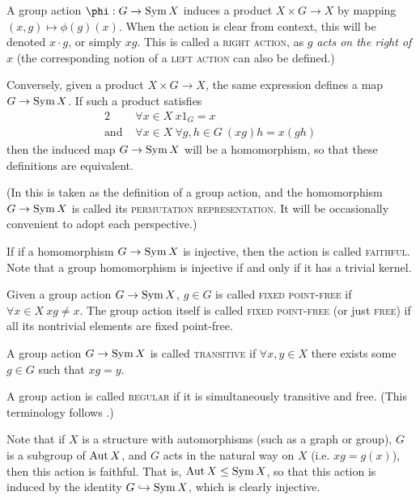 \documentclass{report}
\begin{document}
    A group action $\phi: G \to \Sym X$ induces a product
    $X \times G \to X$ by mapping $(x, g) \mapsto \phi(g)(x)$.
    When the action is clear from context,
    this will be denoted $x \cdot g$, or simply $xg$.
    This is called a \textsc{right action},
    as $g$ \textit{acts on the right of} $x$
    (the corresponding notion of a \textsc{left action}
    can also be defined.)

    Conversely, given a product $X \times G \to X$,
    the same expression defines a map $G \to \operatorname{Sym} X$.
    If such a product satisfies
    \begin{alignat*}{2}
      &\forall x \in X\ x 1_G = x \\
      \text{and } &\forall x \in X\ \forall g, h \in G\
        (x g) h = x(gh)
    \end{alignat*}
    then the induced map $G \to \operatorname{Sym} X$ will be a homomorphism,
    so that these definitions are equivalent.

    (In \cite{dummit-foote}
    this is taken as the definition of a group action,
    and the homomorphism $G \to \operatorname{Sym} X$ is called its \textsc{permutation
    representation}.  It will be occasionally convenient to adopt each
    perspective.)

    \begin{defn}\label{group-action-types}
      If if a homomorphism $G \to \operatorname{Sym} X$ is injective,
      then the action is called \textsc{faithful}.
      Note that a group homomorphism is injective
      if and only if it has a trivial kernel.

      Given a group action $G \to \operatorname{Sym} X$,
      $g \in G$ is called \textsc{fixed point-free}
      if $\forall x \in X\ xg \neq x$.
      The group action itself is called \textsc{fixed point-free}
      (or just \textsc{free}) if all its nontrivial elements
      are fixed point-free.

      A group action $G \to \operatorname{Sym} X$ is called \textsc{transitive}
      if $\forall x, y \in X$ there exists some $g \in G$
      such that $xg = y$.

      A group action is called \textsc{regular} if it is simultaneously
      transitive and free.  (This terminology follows \cite{godsil}.)
    \end{defn}

    Note that if $X$ is a structure with automorphisms
    (such as a graph or group), $G$ is a subgroup of $\operatorname{Aut} X$,
    and $G$ acts in the natural way on $X$ (i.e. $xg = g(x)$),
    then this action is faithful.
    That is, $\operatorname{Aut} X \leq \operatorname{Sym} X$,
    so that this action is induced by the identity $G \hookrightarrow \operatorname{Sym} X$,
    which is clearly injective.
\end{document}
